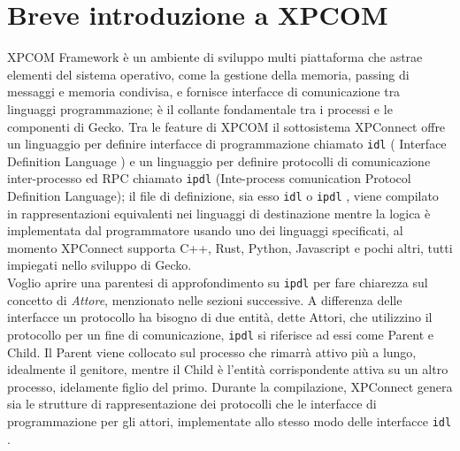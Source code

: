 \documentclass[]{./sapthesis/sapthesis}
\newcommand{\code}[1]{\texttt{#1}}
\newcommand{\idl}{\code{idl} }
\newcommand{\ipdl}{\code{ipdl} }
\begin{document}
    \section{Breve introduzione a XPCOM}
        XPCOM Framework è un ambiente di sviluppo multi piattaforma che astrae elementi del sistema operativo,
        come la gestione della memoria, passing di messaggi e memoria condivisa, e fornisce interfacce di 
        comunicazione tra linguaggi programmazione; è il collante fondamentale tra i processi e le componenti di
        Gecko. Tra le feature di XPCOM il sottosistema XPConnect offre un linguaggio per definire
        interfacce di programmazione chiamato \idl ( Interface Definition Language ) e un linguaggio per definire protocolli
        di comunicazione inter-processo ed RPC chiamato \ipdl (Inte-process comunication Protocol Definition Language);
        il file di definizione, sia esso \idl o \ipdl, viene compilato in rappresentazioni equivalenti nei linguaggi
        di destinazione mentre la logica è implementata dal programmatore usando uno dei linguaggi specificati,
        al momento XPConnect supporta C++, Rust, Python, Javascript e pochi altri, tutti impiegati nello sviluppo
        di Gecko.\\
        Voglio aprire una parentesi di approfondimento su \ipdl per fare chiarezza sul concetto di \textit{Attore}, 
        menzionato nelle sezioni successive. A differenza delle interfacce un protocollo ha bisogno di due entità,
        dette Attori, che utilizzino il protocollo per un fine di comunicazione, \ipdl si riferisce ad essi come 
        Parent e Child. Il Parent viene collocato sul processo che rimarrà attivo più a lungo, idealmente il genitore, 
        mentre il Child è l'entità corrispondente attiva su un altro processo, idelamente figlio del primo.
        Durante la compilazione, XPConnect genera sia le strutture di rappresentazione dei protocolli che le
        interfacce di programmazione per gli attori, implementate allo stesso modo delle interfacce \idl.
\end{document}
